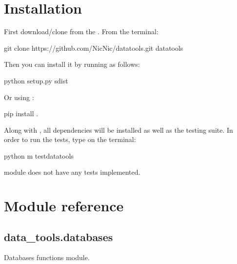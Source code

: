 \documentclass[letterpaper,10pt,english]{sphinxmanual}
\begin{document}
\chapter{Installation}
\label{\detokenize{index:installation}}
First download/clone  from the
.
From the terminal:

\begin{sphinxVerbatim}[commandchars=\\\{\}]
git clone https://github.com/Nic\PYGZhy{}Nic/data\PYGZus{}tools.git
 data\PYGZus{}tools
\end{sphinxVerbatim}

Then you can install it by running  as follows:

\begin{sphinxVerbatim}[commandchars=\\\{\}]
python setup.py sdist
\end{sphinxVerbatim}

Or using :

\begin{sphinxVerbatim}[commandchars=\\\{\}]
pip install .
\end{sphinxVerbatim}

Along with , all dependencies will be installed as well as
the testing suite. In order to run the tests, type on the terminal:

\begin{sphinxVerbatim}[commandchars=\\\{\}]
python \PYGZhy{}m test\PYGZus{}data\PYGZus{}tools
\end{sphinxVerbatim}

  module does not have any tests
implemented.


\chapter{Module reference}
\label{\detokenize{index:module-reference}}\label{\detokenize{databases:module-data_tools.databases}}

\section{data\_tools.databases}
\label{\detokenize{databases:data-tools-databases}}\label{\detokenize{databases::doc}}
Databases functions module.
\end{document}
